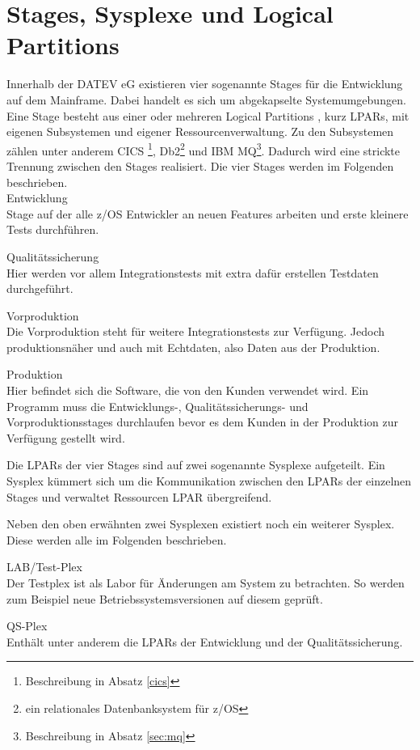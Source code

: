 \section{Stages, Sysplexe und Logical Partitions}\label{sec:sysplex}
Innerhalb der DATEV eG existieren vier sogenannte \glqq Stages\grqq{} für die Entwicklung auf dem Mainframe.
Dabei handelt es sich um abgekapselte Systemumgebungen.
Eine Stage besteht aus einer oder mehreren \glqq Logical Partitions \grqq, kurz LPARs, mit eigenen Subsystemen und eigener Ressourcenverwaltung. 
Zu den Subsystemen zählen unter anderem CICS \footnote{Beschreibung in Absatz \ref{cics}},  Db2\footnote{ein relationales Datenbanksystem für z/OS} und IBM MQ\footnote{Beschreibung in Absatz \ref{sec:mq}}.
Dadurch wird eine strickte Trennung zwischen den Stages realisiert.
Die vier Stages werden im Folgenden beschrieben.\\
\glqq Entwicklung\grqq\\
Stage auf der alle z/OS Entwickler an neuen Features arbeiten und erste kleinere Tests durchführen.

\glqq Qualitätssicherung\grqq\\
Hier werden vor allem Integrationstests mit extra dafür erstellen Testdaten durchgeführt.

\glqq Vorproduktion\grqq\\
Die Vorproduktion steht für weitere Integrationstests zur Verfügung.
Jedoch produktionsnäher und auch mit Echtdaten, also Daten aus der Produktion.

\glqq Produktion\grqq\\
Hier befindet sich die Software, die von den Kunden verwendet wird.
Ein Programm muss die Entwicklungs-, Qualitätssicherungs- und Vorproduktionsstages durchlaufen bevor es dem Kunden in der Produktion zur Verfügung gestellt wird.

Die LPARs der vier Stages sind auf zwei sogenannte  \glqq Sysplexe\grqq{} aufgeteilt.
Ein Sysplex kümmert sich um die Kommunikation zwischen den LPARs der einzelnen Stages und verwaltet Ressourcen LPAR übergreifend.
\cite{Kyne.2016}

Neben den oben erwähnten zwei Sysplexen existiert noch ein weiterer Sysplex.
Diese werden alle im Folgenden beschrieben.

\glqq LAB/Test-Plex\grqq\\
Der Testplex ist als Labor für Änderungen am System zu betrachten.
So werden zum Beispiel neue Betriebssystemsversionen auf diesem geprüft.

\glqq QS-Plex\grqq\\
Enthält unter anderem die LPARs der Entwicklung und der Qualitätssicherung.

